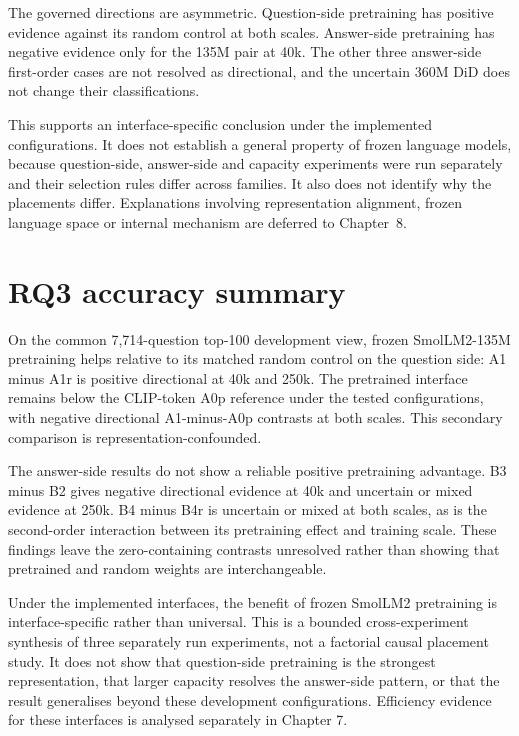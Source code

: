 The governed directions are asymmetric. Question-side pretraining has positive
evidence against its random control at both scales. Answer-side pretraining has
negative evidence only for the 135M pair at 40k. The other three answer-side
first-order cases are not resolved as directional, and the uncertain 360M DiD
does not change their classifications.

This supports an interface-specific conclusion under the implemented
configurations. It does not establish a general property of frozen language
models, because question-side, answer-side and capacity experiments were run
separately and their selection rules differ across families. It also does not
identify why the placements differ. Explanations involving representation
alignment, frozen language space or internal mechanism are deferred to
Chapter~8.

\clearpage
\section{RQ3 accuracy summary}
\label{sec:ch6-summary}
On the common 7,714-question top-100 development view, frozen SmolLM2-135M
pretraining helps relative to its matched random control on the question side:
A1 minus A1r is positive directional at 40k and 250k. The pretrained interface
remains below the CLIP-token A0p reference under the tested configurations,
with negative directional A1-minus-A0p contrasts at both scales. This secondary
comparison is representation-confounded.

The answer-side results do not show a reliable positive pretraining advantage.
B3 minus B2 gives negative directional evidence at 40k and uncertain or mixed
evidence at 250k. B4 minus B4r is uncertain or mixed at both scales, as is the
second-order interaction between its pretraining effect and training scale.
These findings leave the zero-containing contrasts unresolved rather than
showing that pretrained and random weights are interchangeable.

Under the implemented interfaces, the benefit of frozen SmolLM2 pretraining is
interface-specific rather than universal. This is a bounded cross-experiment
synthesis of three separately run experiments, not a factorial causal
placement study. It does not show that question-side pretraining is the
strongest representation, that larger capacity resolves the answer-side
pattern, or that the result generalises beyond these development configurations.
Efficiency evidence for these interfaces is analysed separately in Chapter 7.
